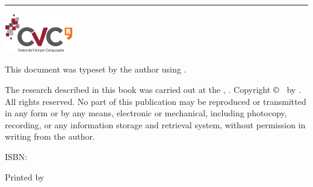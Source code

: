   \noindent\begin{minipage}{\textwidth}
  \setlength{\parskip}{4pt}
  \noindent \rule{80mm}{0.4mm} 
  \includegraphics[trim=40mm 60mm 60mm 100mm,width=3.0cm]{images/LogoCVC.eps}
  \small
  \par
  This document was typeset by the author using \LaTeXe.\par
  The research described in this book was carried out at the \CVC, \UAB. Copyright $\copyright$ \number\year ~by \@author. All rights reserved. No part of this publication may be reproduced or transmitted in any form or by any means, electronic or mechanical, including photocopy, recording, or any information storage and retrieval system, without permission in writing from the author.\par
  ISBN: \ISBN\par
  Printed by \printer
  \end{minipage}
  \setcounter{page}{0}

\makeatother


 \setlength{\parskip}{1em}